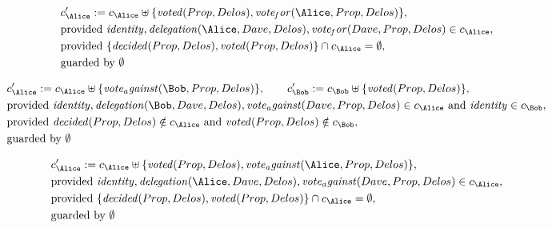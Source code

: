 \begin{align*}
&
c'_
{
\Alice
}
 := 
c_
{
\Alice
}
 \uplus 
\{
\mathit{
voted
}
(
Prop
,
Delos
)
,
\mathit{
vote_for
}
(
\Alice
,
Prop
,
Delos
)
\}
,\\
&
\text{provided } 
\mathit{
identity
}
,
\mathit{
delegation
}
(
\Alice
,
Dave
,
Delos
)
,
\mathit{
vote_for
}
(
Dave
,
Prop
,
Delos
)
 \in c_
{
\Alice
}
,\\
&
\text{provided } 
\{
\mathit{
decided
}
(
Prop
,
Delos
)
,
\mathit{
voted
}
(
Prop
,
Delos
)
\}
 \cap c_
{
\Alice
}
 = \emptyset
,\\
&
\text{guarded by } \emptyset
\end{align*}

\begin{align*}
&
c'_
{
\Alice
}
 := 
c_
{
\Alice
}
 \uplus 
\{
\mathit{
vote_against
}
(
\Bob
,
Prop
,
Delos
)
\}
, \qquad 
c'_
{
\Bob
}
 := 
c_
{
\Bob
}
 \uplus 
\{
\mathit{
voted
}
(
Prop
,
Delos
)
\}
,\\
&
\text{provided } 
\mathit{
identity
}
,
\mathit{
delegation
}
(
\Bob
,
Dave
,
Delos
)
,
\mathit{
vote_against
}
(
Dave
,
Prop
,
Delos
)
 \in c_
{
\Alice
}
 \text{ and } 
\mathit{
identity
}
 \in c_
{
\Bob
}
,\\
&
\text{provided } 
\mathit{
decided
}
(
Prop
,
Delos
)
 \notin c_
{
\Alice
}
 \text{ and } 
\mathit{
voted
}
(
Prop
,
Delos
)
 \notin c_
{
\Bob
}
,\\
&
\text{guarded by } \emptyset
\end{align*}

\begin{align*}
&
c'_
{
\Alice
}
 := 
c_
{
\Alice
}
 \uplus 
\{
\mathit{
voted
}
(
Prop
,
Delos
)
,
\mathit{
vote_against
}
(
\Alice
,
Prop
,
Delos
)
\}
,\\
&
\text{provided } 
\mathit{
identity
}
,
\mathit{
delegation
}
(
\Alice
,
Dave
,
Delos
)
,
\mathit{
vote_against
}
(
Dave
,
Prop
,
Delos
)
 \in c_
{
\Alice
}
,\\
&
\text{provided } 
\{
\mathit{
decided
}
(
Prop
,
Delos
)
,
\mathit{
voted
}
(
Prop
,
Delos
)
\}
 \cap c_
{
\Alice
}
 = \emptyset
,\\
&
\text{guarded by } \emptyset
\end{align*}
